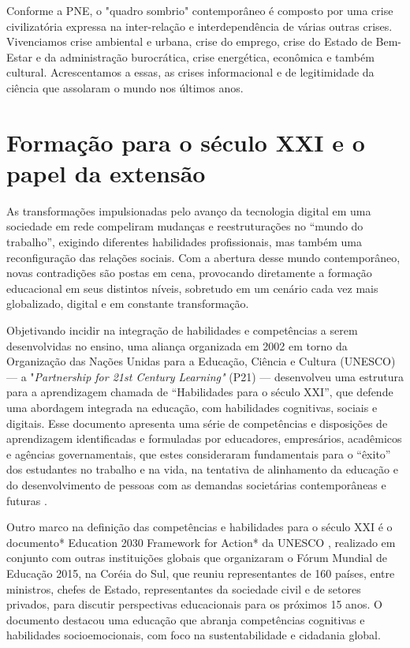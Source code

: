 \documentclass[portuguese]{textolivre}
\begin{document}
Conforme a PNE, o "quadro sombrio" contemporâneo é composto por uma
crise civilizatória expressa na inter-relação e interdependência de
várias outras crises. Vivenciamos crise ambiental e urbana, crise do
emprego, crise do Estado de Bem-Estar e da administração burocrática,
crise energética, econômica e também cultural. Acrescentamos a essas, as
crises informacional e de legitimidade da ciência que assolaram o mundo
nos últimos anos.


\section{Formação para o século XXI e o papel da extensão}

As transformações impulsionadas pelo avanço da tecnologia digital em uma
sociedade em rede \cite{Castells1999} compeliram mudanças e
reestruturações no ``mundo do trabalho'', exigindo diferentes
habilidades profissionais, mas também uma reconfiguração das relações
sociais. Com a abertura desse mundo contemporâneo, novas contradições
são postas em cena, provocando diretamente a formação educacional em
seus distintos níveis, sobretudo em um cenário cada vez mais
globalizado, digital e em constante transformação.

Objetivando incidir na integração de habilidades e competências a serem
desenvolvidas no ensino, uma aliança organizada em 2002 em torno da
Organização das Nações Unidas para a Educação, Ciência e Cultura
(UNESCO) --- a "\emph{Partnership for 21st Century Learning"} (P21) ---
desenvolveu uma estrutura para a aprendizagem chamada de ``Habilidades
para o século XXI'', que defende uma abordagem integrada na educação,
com habilidades cognitivas, sociais e digitais. Esse documento apresenta
uma série de competências e disposições de aprendizagem identificadas e
formuladas por educadores, empresários, acadêmicos e agências
governamentais, que estes consideraram fundamentais para o ``êxito'' dos
estudantes no trabalho e na vida, na tentativa de alinhamento da
educação e do desenvolvimento de pessoas com as demandas societárias
contemporâneas e futuras \cite{Dede2009}.

Outro marco na definição das competências e habilidades para o século
XXI é o documento* Education 2030 Framework for Action* da UNESCO
\cite{UNESCO2016}, realizado em conjunto com outras instituições
globais que organizaram o Fórum Mundial de Educação 2015, na Coréia do
Sul, que reuniu representantes de 160 países, entre ministros, chefes de
Estado, representantes da sociedade civil e de setores privados, para
discutir perspectivas educacionais para os próximos 15 anos. O documento
destacou uma educação que abranja competências cognitivas e habilidades
socioemocionais, com foco na sustentabilidade e cidadania global.
\end{document}
